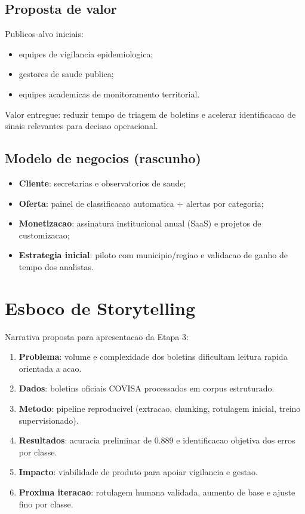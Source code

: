\documentclass[12pt,a4paper]{article}
\begin{document}
\subsection{Proposta de valor}
Publicos-alvo iniciais:
\begin{itemize}[leftmargin=1.2cm]
    \item equipes de vigilancia epidemiologica;
    \item gestores de saude publica;
    \item equipes academicas de monitoramento territorial.
\end{itemize}
Valor entregue: reduzir tempo de triagem de boletins e acelerar identificacao de sinais relevantes para decisao operacional.

\subsection{Modelo de negocios (rascunho)}
\begin{itemize}[leftmargin=1.2cm]
    \item \textbf{Cliente}: secretarias e observatorios de saude;
    \item \textbf{Oferta}: painel de classificacao automatica + alertas por categoria;
    \item \textbf{Monetizacao}: assinatura institucional anual (SaaS) e projetos de customizacao;
    \item \textbf{Estrategia inicial}: piloto com municipio/regiao e validacao de ganho de tempo dos analistas.
\end{itemize}

\section{Esboco de Storytelling}
Narrativa proposta para apresentacao da Etapa 3:
\begin{enumerate}[leftmargin=1.2cm]
    \item \textbf{Problema}: volume e complexidade dos boletins dificultam leitura rapida orientada a acao.
    \item \textbf{Dados}: boletins oficiais COVISA processados em corpus estruturado.
    \item \textbf{Metodo}: pipeline reproducivel (extracao, chunking, rotulagem inicial, treino supervisionado).
    \item \textbf{Resultados}: acuracia preliminar de 0.889 e identificacao objetiva dos erros por classe.
    \item \textbf{Impacto}: viabilidade de produto para apoiar vigilancia e gestao.
    \item \textbf{Proxima iteracao}: rotulagem humana validada, aumento de base e ajuste fino por classe.
\end{enumerate}
\end{document}
